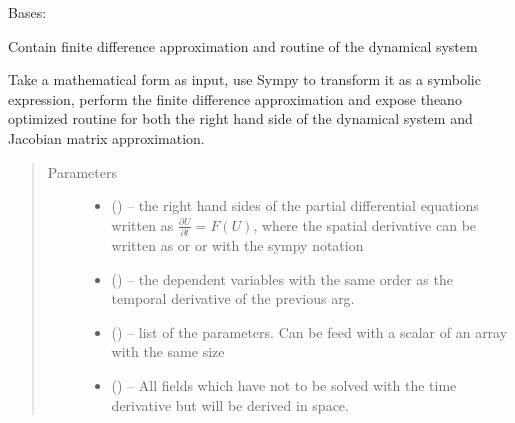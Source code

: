 \documentclass[letterpaper,10pt,english]{sphinxmanual}
\begin{document}
\begin{fulllineitems}
\label{\detokenize{triflow.core:triflow.core.model.Model}}
Bases: 

Contain finite difference approximation and routine of the dynamical system

Take a mathematical form as input, use Sympy to transform it as a symbolic
expression, perform the finite difference approximation and expose theano
optimized routine for both the right hand side of the dynamical system and
Jacobian matrix approximation.
\begin{quote}\begin{description}
\item[{Parameters}] \leavevmode\begin{itemize}
\item {} 
 () -- the right hand sides of the partial differential equations written as \(\frac{\partial U}{\partial t} = F(U)\), where the spatial derivative can be written as  or  or with the sympy notation 

\item {} 
 () -- the dependent variables with the same order as the temporal derivative of the previous arg.

\item {} 
 (\sphinxstyleliteralemphasis{, }\sphinxstyleliteralemphasis{, }) -- list of the parameters. Can be feed with a scalar of an array with the same size

\item {} 
 (\sphinxstyleliteralemphasis{, }) -- All fields which have not to be solved with the time derivative but will be derived in space.


\end{itemize}
\end{description}
\end{quote}
\end{fulllineitems}
\end{document}
